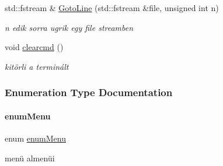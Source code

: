 \begin{DoxyCompactItemize}
std\+::fstream \& \mbox{\hyperlink{_menu_8h_aac067d016b66218b6d8e0578bc214ef0}{Goto\+Line}} (std\+::fstream \&file, unsigned int n)
\begin{DoxyCompactList}\small\item\em n edik sorra ugrik egy file streamben \end{DoxyCompactList}\item 
void \mbox{\hyperlink{_menu_8h_aaa6e5fc0d7c515998e48fe6ae944ca40}{clearcmd}} ()
\begin{DoxyCompactList}\small\item\em kitörli a terminált \end{DoxyCompactList}\end{DoxyCompactItemize}


\subsubsection{Enumeration Type Documentation}
\mbox{\label{_menu_8h_adbc27074b7dcd54cd4578936c6329d02}} 
\paragraph{\texorpdfstring{enumMenu}{enumMenu}}
{\footnotesize\ttfamily enum \mbox{\hyperlink{_menu_8h_adbc27074b7dcd54cd4578936c6329d02}{enum\+Menu}}}



menü almenüi 


